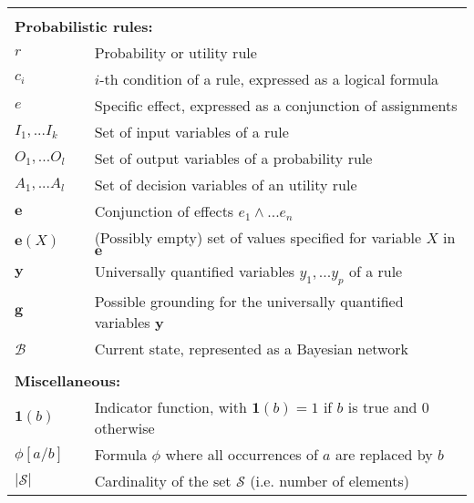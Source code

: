 \begin{longtable}{lp{5mm}p{11cm}}
&&  \vspace{3mm} \\
\multicolumn{3}{l}{\textbf{Probabilistic rules:}} \vspace{2mm} \\
$r$ && Probability or utility rule \\
$c_i$ && $i$-th condition of a rule, expressed as a logical formula \\
$e$ && Specific effect, expressed as a conjunction of assignments \\
$I_1,...I_{k}$  && Set of input variables of a rule\\
$O_1,...O_{l}$ && Set of output variables of a probability rule \\
$A_1,...A_{l}$ && Set of decision variables of an utility rule \\
$\mathbf{e}$ && Conjunction of effects $e_1 \land ... e_n$ \\
$\mathbf{e}(X)$ && (Possibly empty) set of values specified for variable $X$ in $\mathbf{e}$ \\
$\mathbf{y}$ && Universally quantified variables $y_1,... y_p$ of a rule  \\
$\mathbf{g}$ && Possible grounding for the universally quantified variables $\mathbf{y}$ \\
$\mathcal{B}$ && Current state, represented as a Bayesian network \\
&&  \vspace{3mm} \\
\multicolumn{3}{l}{\textbf{Miscellaneous:}} \vspace{2mm} \\
$\mathbf{1}(b)$ && Indicator function, with $\mathbf{1}(b) = 1$ if $b$ is true and 0 otherwise \\
$\phi[a / b]$ && Formula $\phi$ where all occurrences of $a$ are replaced by $b$ \\
$|\mathcal{S}|$ && Cardinality of the set $\mathcal{S}$ (i.e. number of elements) 
\end{longtable}
